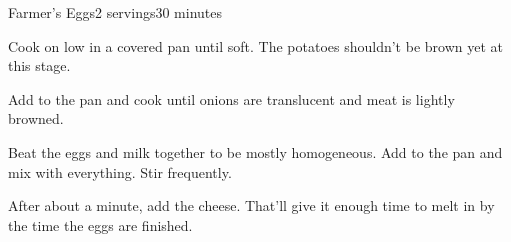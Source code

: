 \documentclass[../Cookbook.tex]{subfiles}
\begin{document}
\begin{recipe}{Farmer's Eggs}{2 servings}{30 minutes}

Cook on low in a covered pan until soft. The potatoes shouldn't be brown yet at this stage.

Add to the pan and cook until onions are translucent and meat is lightly browned.

Beat the eggs and milk together to be mostly homogeneous. 
Add to the pan and mix with everything.
Stir frequently.

After about a minute, add the cheese. 
That'll give it enough time to melt in by the time the eggs are finished.

\end{recipe}
\end{document}
